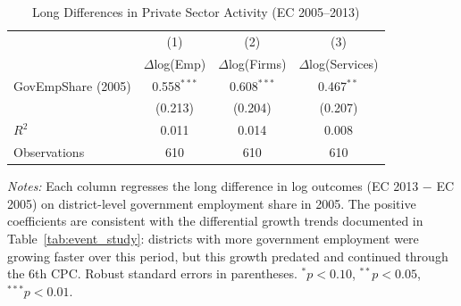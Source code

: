 \begin{table}[t]
\centering
\caption{Long Differences in Private Sector Activity (EC 2005--2013)}
\label{tab:mechanism}
\begin{tabular}{lccc}
\toprule
 & (1) & (2) & (3) \\
 & $\Delta$log(Emp) & $\Delta$log(Firms) & $\Delta$log(Services) \\
\midrule
GovEmpShare (2005) & 0.558$^{***}$ & 0.608$^{***}$ & 0.467$^{**}$ \\
 & (0.213) & (0.204) & (0.207) \\
\addlinespace
$R^2$ & 0.011 & 0.014 & 0.008 \\
Observations & 610 & 610 & 610 \\
\bottomrule
\end{tabular}
\begin{tablenotes}
\item \textit{Notes:} Each column regresses the long difference in log outcomes (EC 2013 $-$ EC 2005) on district-level government employment share in 2005. The positive coefficients are consistent with the differential growth trends documented in Table~\ref{tab:event_study}: districts with more government employment were growing faster over this period, but this growth predated and continued through the 6th CPC. Robust standard errors in parentheses. $^{*}p<0.10$, $^{**}p<0.05$, $^{***}p<0.01$.
\end{tablenotes}
\end{table}
